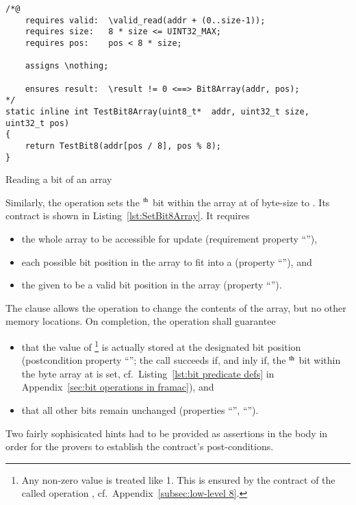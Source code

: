 \begin{listing}[hbt]
\begin{minipage}{0.99\textwidth}
\begin{lstlisting}[style=acsl-block]
/*@
    requires valid:  \valid_read(addr + (0..size-1));
    requires size:   8 * size <= UINT32_MAX;
    requires pos:    pos < 8 * size;

    assigns \nothing;

    ensures result:  \result != 0 <==> Bit8Array(addr, pos);
*/
static inline int TestBit8Array(uint8_t*  addr, uint32_t size, uint32_t pos)
{
    return TestBit8(addr[pos / 8], pos % 8);
}
\end{lstlisting}
\end{minipage}
\caption{\label{lst:TestBit8Array}Reading a bit of an  array}
\end{listing}










Similarly, the operation 
sets the
$^{\mbox{\scriptsize th}}$ bit within the array at
 of
byte-size  to .
%
Its contract is shown in Listing~\ref{lst:SetBit8Array}.
%
It requires
%
\begin{itemize}
\item the whole array to be accessible for update (requirement
	property ``''),
\item each possible bit position in the array to fit into a
	 (property ``''), and
\item the given  to be a valid bit position in the array
	(property ``'').
\end{itemize}
%
The  clause allows the operation to change the
contents of the array,
but no other memory locations.
%
On completion, the operation shall guarantee
\begin{itemize}
\item that the value of \footnote{
		Any non-zero  value is treated like 1.
		This is ensured by the contract of the called operation
		, cf.\ Appendix~\ref{subsec:low-level 8}.
	}
	is actually stored at the designated bit
	position (postcondition property ``'';
	the call  succeeds if, and inly if, the
	$^{\mbox{\scriptsize th}}$ bit within the byte
	array at  is set, 
	cf.\ Listing~\ref{lst:bit predicate defs} in
	Appendix~\ref{sec:bit operations in framac}), and
\item that all other bits remain unchanged 
	(properties ``'', ``'').
\end{itemize}
%
Two fairly sophisicated hints had to be provided as assertions in
the body in order for
the provers to establish the contract's post-conditions.









